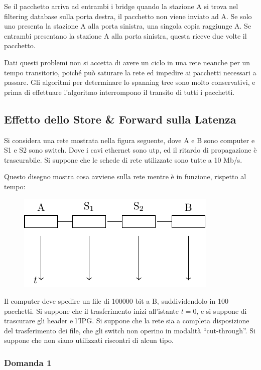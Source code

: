 \documentclass{article}
\numberwithin{equation}{subsection}
\begin{document}
Se il pacchetto arriva ad entrambi i bridge quando la stazione A si trova nel 
filtering database sulla porta destra, il pacchetto non viene inviato ad A. Se solo uno presenta la stazione A alla porta sinistra, una singola copia raggiunge A. 
Se entrambi presentano la stazione A alla porta sinistra, questa riceve due volte il pacchetto. 


Dati questi problemi non si accetta di avere un ciclo in una rete neanche per un tempo transitorio, poiché può saturare la rete ed impedire ai pacchetti necessari a 
passare. Gli algoritmi per determinare lo spanning tree sono molto conservativi, e prima di effettuare l'algoritmo interrompono il transito di tutti i pacchetti. 
\clearpage

\subsection{Effetto dello Store \& Forward sulla Latenza}

Si considera una rete mostrata nella figura seguente, dove A e B sono computer e S1 e S2 sono switch. Dove i cavi ethernet sono utp, ed il ritardo di propagazione 
è trascurabile. Si suppone che le schede di rete utilizzate sono tutte a 10 Mb/s. 

Questo disegno mostra cosa avviene sulla rete mentre è in funzione, rispetto al tempo:

\begin{figure}[H]%
    \centering%
    \includegraphics{effetto_store_forward.pdf}%
\end{figure}

Il computer deve spedire un file di 100000 bit a B, suddividendolo in 100 pacchetti. Si suppone che il trasferimento inizi all'istante $t=0$, e si suppone di trascurare 
gli header e l'IPG. Si suppone che la rete sia a completa disposizione del trasferimento dei file, che gli switch non operino in modalità ``cut-through''. Si suppone che non 
siano utilizzati riscontri di alcun tipo. 

\subsubsection*{Domanda 1}
\end{document}
